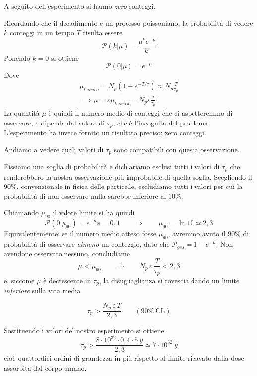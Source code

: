 A seguito dell'esperimento si hanno \emph{zero} conteggi. 

Ricordando che il decadimento è un processo poissoniano, la probabilità di vedere $k$ conteggi in un tempo $T$ risulta essere 
%
\begin{equation*}
    \mathcal{P}(k|\mu) = \frac{\mu^k e^{-\mu}}{k!}
\end{equation*}
Ponendo $k = 0$ si ottiene 
%
\begin{equation*}
    \mathcal{P}(0|\mu) = e^{-\mu}
\end{equation*}
Dove 
%
\begin{align*}
    \mu_{teorico} = N_p(1 - e^{-T/\tau}) \approx N_p \frac{T}{\tau_p}\\
    \implies \mu = \varepsilon \mu_{teorico} = N_p \varepsilon \frac{T}{\tau_p}
\end{align*}
La quantità $\mu$ è quindi il numero medio di conteggi che ci aspetteremmo di osservare, e dipende dal valore di $\tau_p$, che è l'incognita del problema. L'esperimento ha invece fornito un risultato preciso: zero conteggi. 

Andiamo a vedere quali valori di $\tau_p$ sono compatibili con questa osservazione. 

Fissiamo una soglia di probabilità e dichiariamo esclusi tutti i valori di $\tau_p$ che renderebbero la nostra osservazione più improbabile di quella soglia. Scegliendo il $90\%$, convenzionale in fisica delle particelle, escludiamo tutti i valori per cui la probabilità di non osservare nulla sarebbe inferiore al $10\%$. 

Chiamando $\mu_{90}$ il valore limite si ha quindi
%
\begin{equation*}
    \mathcal{P}(0|\mu_{90}) = e^{-\mu_{90}} = 0,1 \qquad \Longrightarrow \qquad \mu_{90} = \ln 10 \simeq 2,3
\end{equation*}
Equivalentemente: se il numero medio atteso fosse $\mu_{90}$, avremmo avuto il $90\%$ di probabilità di osservare \emph{almeno} un conteggio, dato che $\mathcal{P}_{oss} = 1 - e^{-\mu}$. Non avendone osservato nessuno, concludiamo
%
\begin{equation*}
    \mu < \mu_{90} \qquad \Longrightarrow \qquad N_p \, \varepsilon \, \frac{T}{\tau_p} < 2,3
\end{equation*}
e, siccome $\mu$ è decrescente in $\tau_p$, la disuguaglianza si rovescia dando un limite \emph{inferiore} sulla vita media

\begin{tcolorbox}[colback=black!5!white, colframe=black!45!white, boxrule=0.8pt]
\begin{equation}
    \tau_p > \frac{N_p \, \varepsilon \, T}{2,3} \qquad (90\% \ \text{CL})
    \label{eq:limite_poissoniano}
\end{equation}
\end{tcolorbox}
Sostituendo i valori del nostro esperimento si ottiene
%
\begin{equation*}
    \tau_p > \frac{8 \cdot 10^{32} \cdot 0,4 \cdot 5 \ y}{2,3} \simeq 7 \cdot 10^{32} \ y
\end{equation*}
cioè quattordici ordini di grandezza in più rispetto al limite ricavato dalla dose assorbita dal corpo umano.\\

